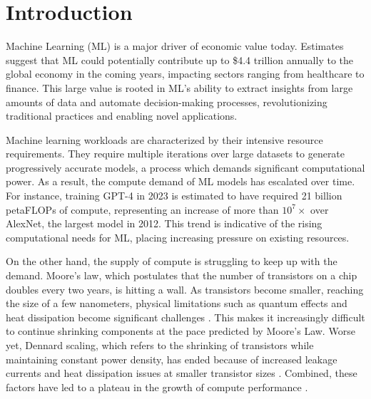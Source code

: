 \chapter{Introduction}
\label{ch_intro}

\newcommand{\fillme}{\textcolor{red}{FILL ME}}

Machine Learning (ML) is a major driver of economic value today.  Estimates suggest that ML could potentially contribute up to \$4.4 trillion annually \cite{mckinseygenai} to the global economy in the coming years, impacting sectors ranging from healthcare to finance. This large value is rooted in ML's ability to extract insights from large amounts of data and automate decision-making processes, revolutionizing traditional practices and enabling novel applications.

Machine learning workloads are characterized by their intensive resource requirements. They require multiple iterations over large datasets to generate progressively accurate models, a process which demands significant computational power. 
As a result, the compute demand of ML models has escalated over time. 
For instance, training GPT-4\cite{openai2023gpt4} in 2023 is estimated to have required 21 billion petaFLOPs\cite{mlmodelflops} of compute, representing an increase of more than $10^{7}\times$ over AlexNet, the largest model in 2012. This trend is indicative of the rising computational needs for ML, placing increasing pressure on existing resources.


On the other hand, the supply of compute is struggling to keep up with the demand. Moore's law, which postulates that the number of transistors on a chip doubles every two years, is hitting a wall. As transistors become smaller, reaching the size of a few nanometers, physical limitations such as quantum effects and heat dissipation become significant challenges \cite{mooreslawend}. This makes it increasingly difficult to continue shrinking components at the pace predicted by Moore's Law. Worse yet, Dennard scaling, which refers to the shrinking of transistors while maintaining constant power density, has ended because of increased leakage currents and heat dissipation issues at smaller transistor sizes \cite{dennardscalingend}. Combined, these factors have led to a plateau in the growth of compute performance \cite{cpudb}.

